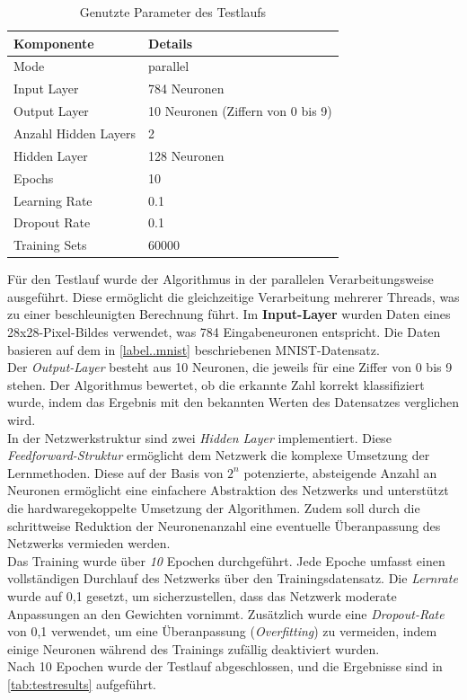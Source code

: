 \documentclass[a4paper, 12pt]{article}
\begin{document}
\begin{table}[h!]
	\centering
	\begin{tabular}{@{}ll@{}}
	\toprule
	\textbf{Komponente}    & \textbf{Details} \\ \midrule
	Mode                   & parallel \\
	Input Layer            & 784 Neuronen \\
	Output Layer           & 10 Neuronen (Ziffern von 0 bis 9) \\
	Anzahl Hidden Layers   & 2 \\
	Hidden Layer           & 128 Neuronen \\
	Epochs                 & 10 \\
	Learning Rate          & 0.1 \\
	Dropout Rate           & 0.1 \\
	Training Sets          & 60000 \\ \bottomrule
	\end{tabular}
	\caption{Genutzte Parameter des Testlaufs}
	\label{tab:testparas}
\end{table}

Für den Testlauf wurde der Algorithmus in der parallelen Verarbeitungsweise ausgeführt. Diese 
ermöglicht die gleichzeitige Verarbeitung mehrerer Threads, was zu einer beschleunigten Berechnung 
führt. Im \textbf{Input-Layer} wurden Daten eines 28x28-Pixel-Bildes verwendet, was 784 
Eingabeneuronen entspricht. Die Daten basieren auf dem in \autoref{label..mnist} beschriebenen 
MNIST-Datensatz.\\
Der \textit{Output-Layer} besteht aus 10 Neuronen, die jeweils für eine Ziffer von 0 bis 9 stehen. 
Der Algorithmus bewertet, ob die erkannte Zahl korrekt klassifiziert wurde, indem das Ergebnis mit 
den bekannten Werten des Datensatzes verglichen wird.\\
In der Netzwerkstruktur sind zwei \textit{Hidden Layer} implementiert. Diese \textit{Feedforward-Struktur}
ermöglicht dem Netzwerk die komplexe Umsetzung der Lernmethoden. Diese auf der Basis von \(2^n\) 
potenzierte, absteigende Anzahl an Neuronen ermöglicht eine einfachere Abstraktion des Netzwerks und 
unterstützt die hardwaregekoppelte Umsetzung der Algorithmen. Zudem soll durch die schrittweise 
Reduktion der Neuronenanzahl eine eventuelle Überanpassung des Netzwerks vermieden werden.\\
Das Training wurde über \textit{10} Epochen durchgeführt. Jede Epoche umfasst einen vollständigen 
Durchlauf des Netzwerks über den Trainingsdatensatz. Die \textit{Lernrate} wurde auf 0,1 gesetzt, 
um sicherzustellen, dass das Netzwerk moderate Anpassungen an den Gewichten vornimmt. Zusätzlich 
wurde eine \textit{Dropout-Rate} von 0,1 verwendet, um eine Überanpassung (\textit{Overfitting}) zu 
vermeiden, indem einige Neuronen während des Trainings zufällig deaktiviert wurden.\\
Nach 10 Epochen wurde der Testlauf abgeschlossen, und die Ergebnisse sind in 
\autoref{tab:testresults} aufgeführt.
\end{document}
